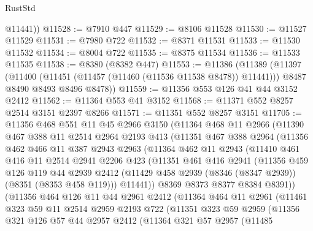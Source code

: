 \begin{lexlean}{RustStd}
\begin{coremodule}
{\begin{coremodule}
{{{{{{{{{{{{{{{{{{{{{{{{{{{{{{{{{{{{{{{{{{{{{{{{{{        @11441))
@11528 := @7910 @447
@11529 := @8106 @11528
@11530 := @11527 @11529
@11531 := @7980 @722
@11532 := @8371 @11531
@11533 := @11530 @11532
@11534 := @8004 @722
@11535 := @8375 @11534
@11536 := @11533 @11535
@11538 := @8380 (@8382 @447)
@11553 := @11386
    (@11389
      (@11397
        (@11400 (@11451 (@11457 (@11460 (@11536 @11538 @8478)) @11441)))
        @8487
        @8490
        @8493
        @8496
        @8478))
@11559 := @11356 @553 @126 @41 @44 @3152 @2412
@11562 := @11364 @553 @41 @3152
@11568 := @11371 @552 @8257 @2514 @3151 @2397 @8266
@11571 := @11351 @552 @8257 @3151
@11705 := @11356
    @468
    @551
    @11
    @45
    @2966
    @3150
    (@11364
      @468
      @11
      @2966
      (@11390
        @467
        @388
        @11
        @2514
        @2964
        @2193
        @413
        (@11351
          @467
          @388
          @2964
          (@11356
            @462
            @466
            @11
            @387
            @2943
            @2963
            (@11364
              @462
              @11
              @2943
              (@11410
                @461
                @416
                @11
                @2514
                @2941
                @2206
                @423
                (@11351
                  @461
                  @416
                  @2941
                  (@11356
                    @459
                    @126
                    @119
                    @44
                    @2939
                    @2412
                    (@11429 @458 @2939 (@8346 (@8347 @2939)) (@8351 (@8353 @458 @119)))
                    @11441))
                @8369
                @8373
                @8377
                @8384
                @8391))
            (@11356
              @464
              @126
              @11
              @44
              @2961
              @2412
              (@11364
                @464
                @11
                @2961
                (@11461
                  @323
                  @59
                  @11
                  @2514
                  @2959
                  @2193
                  @722
                  (@11351
                    @323
                    @59
                    @2959
                    (@11356
                      @321
                      @126
                      @57
                      @44
                      @2957
                      @2412
                      (@11364
                        @321
                        @57
                        @2957
                        (@11485
}}}}}}}}}}}}}}}}}}}}}}}}}}}}}}}}}}}}}}}}}}}}}}}}}}
\end{coremodule}}
\end{coremodule}
\end{lexlean}
